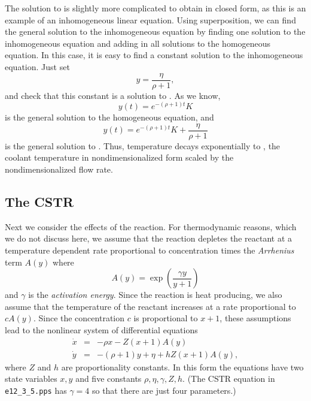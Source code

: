 \documentclass{ximera}
\begin{document}
The solution to  is slightly more complicated
to obtain in closed form, as this is an example of an
inhomogeneous linear equation.  Using 
superposition, we can find
the general solution to the inhomogeneous equation by finding
one solution to the inhomogeneous 
equation and adding in all
solutions to the homogeneous equation.  
In this case, it is easy to find a constant solution to the 
inhomogeneous equation.  Just set
\begin{equation}  \label{e:basetemp}
y = \frac{\eta}{\rho+1},
\end{equation}
and check that this constant is a solution to
.  As we know,
\[
y(t) = e^{-(\rho+1)t}K
\]
is the general solution to the homogeneous equation, and
\[
y(t) = e^{-(\rho+1)t}K + \frac{\eta}{\rho+1}
\]
is the general solution to .  Thus,
temperature decays exponentially to , the
coolant temperature in nondimensionalized form scaled by the
nondimensionalized flow rate.

\subsection*{The CSTR}
 
Next we consider the effects of the reaction.  For thermodynamic
reasons, which we do not discuss here, we assume that the
reaction depletes the reactant at a temperature dependent rate
proportional to concentration times the {\em Arrhenius\/} term
 $A(y)$ where
\[
A(y) = \exp\left(\frac{\gamma y}{y+1}\right)
\]
and $\gamma$ is the {\em activation 
energy\/}.  Since the
reaction is heat producing, we also assume that the temperature
of the reactant increases at a rate proportional to $cA(y)$.
Since the concentration $c$ is proportional to $x+1$, these
assumptions lead to the nonlinear system of differential
equations
\begin{equation*} \label{e:CSTR}
\begin{array}{rcl}
\dot{x} & = & -\rho x  - Z(x+1)A(y) \\
\dot{y} & = & -(\rho+1)y + \eta + hZ(x+1)A(y),
\end{array}
\end{equation*}
where $Z$ and $h$ are proportionality constants.  In this form
the equations have two state variables $x,y$ and five constants
$\rho,\eta,\gamma,Z,h$.  (The CSTR equation in {\tt e12\_3\_5.pps} has
$\gamma=4$ so that there are just four parameters.)
\end{document}
